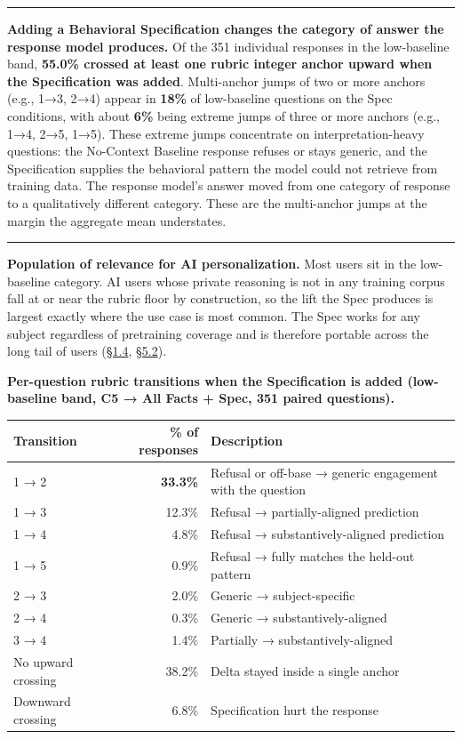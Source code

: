 \begin{center}\rule{0.5\linewidth}{0.5pt}\end{center}

\textbf{Adding a Behavioral Specification changes the category of answer
the response model produces.} Of the 351 individual responses in the
low-baseline band, \textbf{55.0\% crossed at least one rubric integer
anchor upward when the Specification was added}. Multi-anchor jumps of
two or more anchors (e.g., 1→3, 2→4) appear in \textbf{18\%} of
low-baseline questions on the Spec conditions, with about \textbf{6\%}
being extreme jumps of three or more anchors (e.g., 1→4, 2→5, 1→5).
These extreme jumps concentrate on interpretation-heavy questions: the
No-Context Baseline response refuses or stays generic, and the
Specification supplies the behavioral pattern the model could not
retrieve from training data. The response model's answer moved from one
category of response to a qualitatively different category. These are
the multi-anchor jumps at the margin the aggregate mean understates.

\begin{center}\rule{0.5\linewidth}{0.5pt}\end{center}

\textbf{Population of relevance for AI personalization.} Most users sit
in the low-baseline category. AI users whose private reasoning is not in
any training corpus fall at or near the rubric floor by construction, so
the lift the Spec produces is largest exactly where the use case is most
common. The Spec works for any subject regardless of pretraining
coverage and is therefore portable across the long tail of users (\hyperref[what-this-implies]{§1.4},
\hyperref[why-the-gradient-is-the-load-bearing-finding]{§5.2}).

\textbf{Per-question rubric transitions when the Specification is added
(low-baseline band, C5 → All Facts + Spec, 351 paired questions).}

\begin{longtable}[]{@{}lrl@{}}
\toprule
Transition & \% of responses & Description \\
\midrule
\endhead
1 → 2 & \textbf{33.3\%} & Refusal or off-base → generic engagement with
the question \\
1 → 3 & 12.3\% & Refusal → partially-aligned prediction \\
1 → 4 & 4.8\% & Refusal → substantively-aligned prediction \\
1 → 5 & 0.9\% & Refusal → fully matches the held-out pattern \\
2 → 3 & 2.0\% & Generic → subject-specific \\
2 → 4 & 0.3\% & Generic → substantively-aligned \\
3 → 4 & 1.4\% & Partially → substantively-aligned \\
No upward crossing & 38.2\% & Delta stayed inside a single anchor \\
Downward crossing & 6.8\% & Specification hurt the response \\
\bottomrule
\end{longtable}

